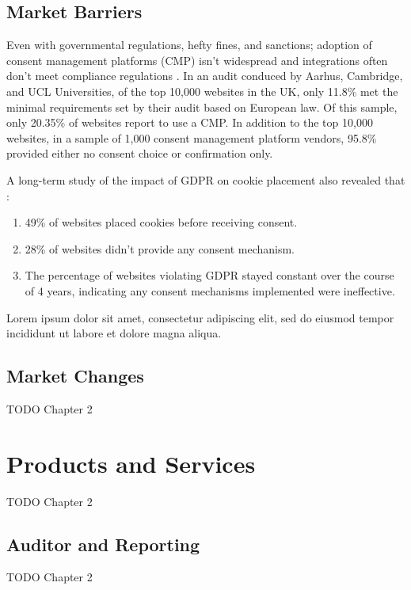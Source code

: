 \subsection{Market Barriers}

Even with governmental regulations, hefty fines, and sanctions; adoption of consent management platforms (CMP) isn't widespread and integrations often don't meet compliance regulations \cite{nouwens.2020}. In an audit conduced by Aarhus, Cambridge, and UCL Universities, of the top 10,000 websites in the UK, only 11.8\% met the minimal requirements set by their audit based on European law. Of this sample, only 20.35\% of websites report to use a CMP. In addition to the top 10,000 websites, in a sample of 1,000 consent management platform vendors, 95.8\% provided either no consent choice or confirmation only.

A long-term study of the impact of GDPR on cookie placement also revealed that \cite{trevisan.2019}:

\begin{enumerate}
  \item 49\% of websites placed cookies before receiving consent.
  \item 28\% of websites didn't provide any consent mechanism.
  \item The percentage of websites violating GDPR stayed constant over the course of 4 years, indicating any consent mechanisms implemented were ineffective.
\end{enumerate}


\noindent
Lorem ipsum dolor sit amet, consectetur adipiscing elit, sed do eiusmod tempor incididunt ut labore et dolore magna aliqua.

\subsection{Market Changes}

TODO Chapter 2


\section{Products and Services}
TODO Chapter 2


\subsection{Auditor and Reporting}
TODO Chapter 2

